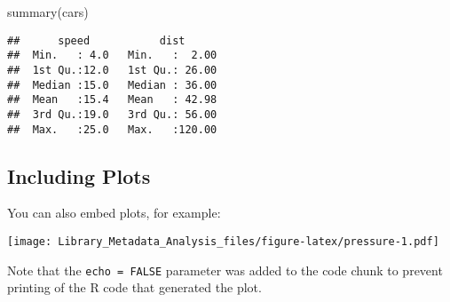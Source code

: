 \documentclass[
]{article}
\newenvironment{Shaded}{\begin{snugshade}}{\end{snugshade}}
\newcommand{\FunctionTok}[1]{\textcolor[rgb]{0.00,0.00,0.00}{#1}}
\newcommand{\NormalTok}[1]{#1}
\begin{document}
\begin{Shaded}
\begin{Highlighting}[]
\FunctionTok{summary}\NormalTok{(cars)}
\end{Highlighting}
\end{Shaded}

\begin{verbatim}
##      speed           dist       
##  Min.   : 4.0   Min.   :  2.00  
##  1st Qu.:12.0   1st Qu.: 26.00  
##  Median :15.0   Median : 36.00  
##  Mean   :15.4   Mean   : 42.98  
##  3rd Qu.:19.0   3rd Qu.: 56.00  
##  Max.   :25.0   Max.   :120.00
\end{verbatim}

\hypertarget{including-plots}{%
\subsection{Including Plots}\label{including-plots}}

You can also embed plots, for example:

\texttt{[image: Library\_Metadata\_Analysis\_files/figure-latex/pressure-1.pdf]}

Note that the \texttt{echo\ =\ FALSE} parameter was added to the code
chunk to prevent printing of the R code that generated the plot.
\end{document}
